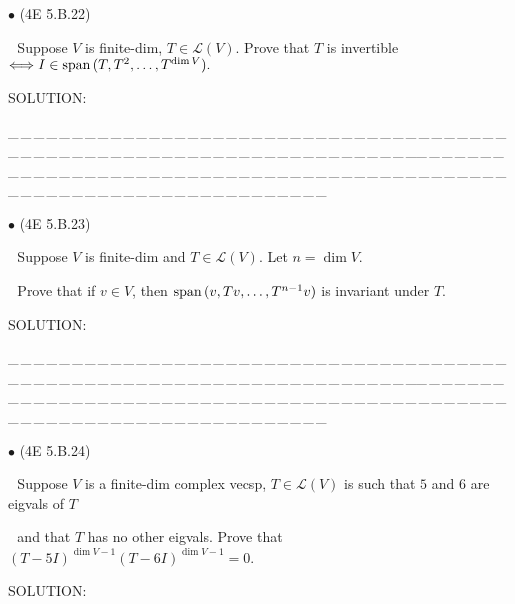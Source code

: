 \documentclass[a4paper, 11pt, UTF8]{article}
\def\Spn{\textup{span}\,}
\def\Lm{\mathcal{L}}
\begin{document}
\begin{large}
{\small $\bullet$} (\normalsize{4E 5.B.22})\par\,\, {\timessl\Large 
Suppose $V$ is finite-dim, $T\in \Lm(V)$. Prove that $T$ is invertible $\Longleftrightarrow I\in\Spn(T, T^2, \dots , T^{\dim V}).$
}\par
{\timesbf S\footnotesize{OLUTION:}}\par\quad

\par
{\tiny \_\,\_\,\_\,\_\,\_\,\_\,\_\,\_\,\_\,\_\,\_\,\_\,\_\,\_\,\_\,\_\,\_\,\_\,\_\,\_\,\_\,\_\,\_\,\_\,\_\,\_\,\_\,\_\,\_\,\_\,\_\,\_\,\_\,\_\,\_\,\_\,\_\,\_\,\_\,\_\,\_\,\_\,\_\,\_\,\_\,\_\,\_\,\_\,\_\,\_\,\_\,\_\,\_\,\_\,\_\,\_\,\_\,\_\,\_\,\_\,\_\,\_\,\_\,\_\,\_\,\_\,\_\,\_\,\_\,\_\,\_\_\,\_\,\_\,\_\,\_\,\_\,\_\,\_\,\_\,\_\,\_\,\_\,\_\,\_\,\_\,\_\,\_\,\_\,\_\,\_\,\_\,\_\,\_\,\_\,\_\,\_\,\_\,\_\,\_\,\_\,\_\,\_\,\_\,\_\,\_\,\_\,\_\,\_\,\_\,\_\,\_\,\_\,\_\,\_\,\_\,\_\,\_\,\_\,\_\,\_\,\_\,\_\,\_\,\_\,\_\,\_\,\_\,\_\,\_\,\_\,\_\,\_\,\_\,\_\,\_\,\_\,\_\,\_\,\_\,\_\,\_}\par

{\small $\bullet$} (\normalsize{4E 5.B.23})\par\,\, {\timessl\Large 
Suppose $V$ is finite-dim and $T\in \Lm(V)$. Let $n = \dim V$.}\par\,\,
{\timessl\Large Prove that if $v \in V$, then $\Spn(v, Tv, \dots , T^{n-1} v)$ is invariant under $T$.
}\par
{\timesbf S\footnotesize{OLUTION:}}\par\quad

\par
{\tiny \_\,\_\,\_\,\_\,\_\,\_\,\_\,\_\,\_\,\_\,\_\,\_\,\_\,\_\,\_\,\_\,\_\,\_\,\_\,\_\,\_\,\_\,\_\,\_\,\_\,\_\,\_\,\_\,\_\,\_\,\_\,\_\,\_\,\_\,\_\,\_\,\_\,\_\,\_\,\_\,\_\,\_\,\_\,\_\,\_\,\_\,\_\,\_\,\_\,\_\,\_\,\_\,\_\,\_\,\_\,\_\,\_\,\_\,\_\,\_\,\_\,\_\,\_\,\_\,\_\,\_\,\_\,\_\,\_\,\_\,\_\_\,\_\,\_\,\_\,\_\,\_\,\_\,\_\,\_\,\_\,\_\,\_\,\_\,\_\,\_\,\_\,\_\,\_\,\_\,\_\,\_\,\_\,\_\,\_\,\_\,\_\,\_\,\_\,\_\,\_\,\_\,\_\,\_\,\_\,\_\,\_\,\_\,\_\,\_\,\_\,\_\,\_\,\_\,\_\,\_\,\_\,\_\,\_\,\_\,\_\,\_\,\_\,\_\,\_\,\_\,\_\,\_\,\_\,\_\,\_\,\_\,\_\,\_\,\_\,\_\,\_\,\_\,\_\,\_\,\_\,\_}\par

{\small $\bullet$} (\normalsize{4E 5.B.24})\par\,\, {\timessl\Large 
Suppose $V$ is a finite-dim complex vecsp, $T\in \Lm(V)$ is such that $5$ and $6$ are eigvals of $T$}\par\,\,
{\timessl\Large and that $T$ has no other eigvals.
Prove that $(T - 5I)^{\dim V-1} (T - 6I)^{\dim V-1} = 0$.
}\par
{\timesbf S\footnotesize{OLUTION:}}\par\quad


\end{large}
\end{document}
